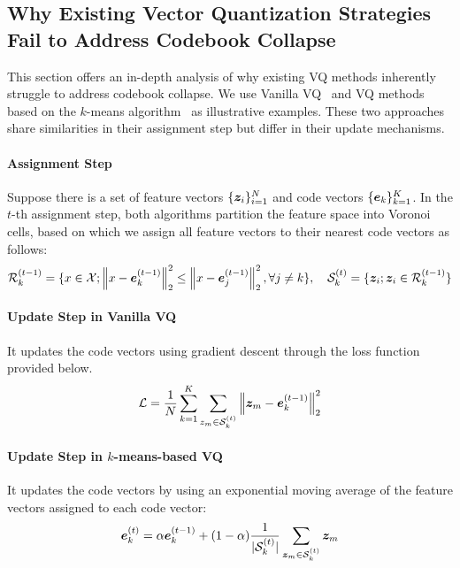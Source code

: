 \subsection{Why Existing Vector Quantization Strategies Fail to Address Codebook Collapse}
\label{appendix:VQ codebook collapse}

This section offers an in-depth analysis of why existing VQ methods inherently struggle to address codebook collapse. We use Vanilla VQ~\cite{Oord2017NeuralDR} and VQ methods based on the $k$-means algorithm~\cite{Razavi2019GeneratingDH} as illustrative examples. These two approaches share similarities in their assignment step but differ in their update mechanisms. 

\paragraph{Assignment Step} 
Suppose there is a set of feature vectors $\{\bm{z}_i\}_{i=1}^N$ and code vectors $\{\bm{e}_k\}_{k=1}^K$. In the $t$-th assignment step, both algorithms partition the feature space into Voronoi cells, based on which we assign all feature vectors to their nearest code vectors as follows: 
\begin{align}
\mathcal{R}_k^{(t-1)} = \{x \in \mathcal{X}; \left\Vert x- \be_k^{(t-1)} \right\Vert_2^{2} \leq \left\Vert x- \be_j^{(t-1)} \right\Vert_2^{2}, \forall j \neq k\}, \quad \mathcal{S}_{k}^{(t)} = \{\bz_i; \bz_i \in \mathcal{R}_k^{(t-1)}\}
\vspace{-10pt}
\end{align}

\paragraph{Update Step in Vanilla VQ} It updates the code vectors using gradient descent through the loss function provided below.
\begin{align}
\mathcal{L} = \frac{1}{N}\sum_{k=1}^{K}\sum_{z_m \in \mathcal{S}_{k}^{(t)}} \left\Vert \bz_m - \be_k^{(t-1)} \right\Vert_2^{2} 
\vspace{-10pt}
\end{align} 
 
\paragraph{Update Step in $k$-means-based VQ} It updates the code vectors by using an exponential moving average of the feature vectors assigned to each code vector:
\begin{align}
\be_k^{(t)} = \alpha \be_k^{(t-1)} + (1-\alpha) \frac{1}{|\mathcal{S}_{k}^{(t)}|} \sum_{\bz_m \in \mathcal{S}_{k}^{(t)}} \bz_m
\vspace{-10pt}
\end{align} 

